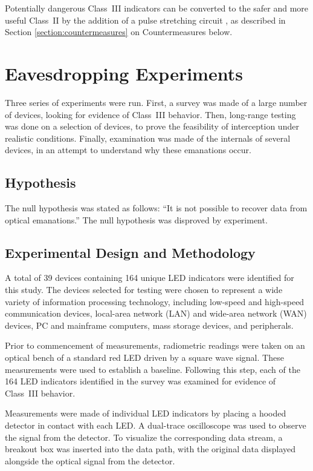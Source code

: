 \documentclass{acmtrans2e}
\begin{document}
Potentially dangerous Class~III indicators can be converted to the safer 
and more useful Class~II by the addition of a pulse stretching circuit
\cite{pulse_stretcher}, as described in Section \ref{section:countermeasures}
on Countermeasures below.

\section{Eavesdropping Experiments}

Three series of experiments were run.  First, a survey was made of a 
large number of devices, looking for evidence of Class~III behavior.  
Then, long-range testing was done on a selection of devices, to prove the 
feasibility of interception under realistic conditions.  Finally, 
examination was made of the internals of several devices, in an attempt 
to understand why these emanations occur.

\subsection{Hypothesis}

The null hypothesis was stated as follows: ``It is not possible to recover
data from optical emanations.''  The null hypothesis was disproved
by experiment.
 
\subsection{Experimental Design and Methodology}

A total of 39 devices containing 164 unique LED indicators were 
identified for this study.  The devices selected for testing were chosen 
to represent a wide variety of information processing technology, 
including low-speed and high-speed communication devices, local-area 
network (LAN) and wide-area network (WAN) devices, PC and mainframe 
computers, mass storage devices, and peripherals.

Prior to commencement of measurements, radiometric readings were
taken on an optical bench of a standard 
red LED driven by a square wave signal.  These measurements were used to 
establish a baseline.  Following this step, each of the 164 LED 
indicators identified in the survey was examined for evidence of 
Class~III behavior.

Measurements were made of individual LED indicators by placing a hooded
detector in contact with each LED.  A dual-trace oscilloscope was used 
to observe the signal from the detector.  To visualize the corresponding 
data stream, a breakout box was inserted into the data path, with the 
original data displayed alongside the optical signal from the detector. 
 
\end{document}
